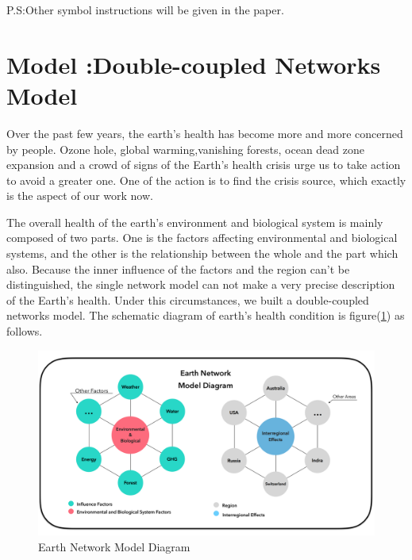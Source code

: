 \documentclass[a4paper,11pt]{article}
\begin{document}
P.S:Other symbol instructions will be given in the paper.




\section{Model \uppercase\expandafter{}:Double-coupled Networks Model}



\par Over the past few years, the earth's health has become more and more concerned by people. Ozone hole, global warming,vanishing forests, ocean dead zone expansion and a crowd of signs of the Earth's health crisis urge us to take action to avoid a greater one. One of the action is to find the crisis source, which exactly is the aspect of our work now.
\par The overall health of the earth's environment and biological system is mainly composed of two parts. One is the factors affecting environmental and biological systems, and the other is the relationship between the whole and the part which also. Because the inner influence of the factors and the region can't be distinguished, the single network model can not make a very precise description of the Earth's health. Under this circumstances, we built a double-coupled networks model. The schematic diagram of earth's health condition is figure(\ref{fig:Earth_Network_Model_Diagram}) as follows.

\begin{figure}[h]%
    \centering %
    \includegraphics[width=1.0\textwidth]{./Pic/Earth_Network_Model_Diagram.png}
    \caption{Earth Network Model Diagram} 
    \label{fig:Earth_Network_Model_Diagram}  
    \end{figure}
\end{document}
